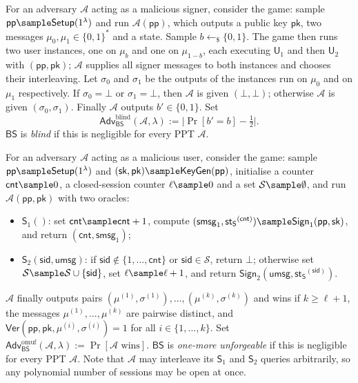 \documentclass{conjura-conjecture}
\newcommand{\BS}{\mathsf{BS}}
\newcommand{\Setup}{\mathsf{Setup}}
\newcommand{\KeyGen}{\mathsf{KeyGen}}
\newcommand{\Sign}{\mathsf{Sign}}
\newcommand{\Uu}{\mathsf{U}}
\newcommand{\Ver}{\mathsf{Ver}}
\newcommand{\pubp}{\mathsf{pp}}
\newcommand{\seck}{\mathsf{sk}}
\newcommand{\pubk}{\mathsf{pk}}
\newcommand{\smsg}{\mathsf{smsg}}
\newcommand{\umsg}{\mathsf{umsg}}
\newcommand{\stS}{\mathsf{st_S}}
\newcommand{\Adv}{\mathsf{Adv}}
\newcommand{\Sorc}{\mathsf{S}}
\newcommand{\cnt}{\mathsf{cnt}}
\newcommand{\sessid}{\mathsf{sid}}
\newcommand{\Ablind}{\Adv^{\mathrm{blind}}}
\newcommand{\Aomuf}{\Adv^{\mathrm{omuf}}}
\newcommand{\rsample}{\leftarrow_{\$}}
\newcommand{\advA}{\mathcal{A}}
\begin{document}
\begin{definition}[Blindness]\label{def:blind}
For an adversary $\advA$ acting as a malicious signer, consider the game:
sample $\pubp \sample \Setup(1^\lambda)$ and run $\advA(\pubp)$, which
outputs a public key $\pubk$, two messages
$\mu_0, \mu_1 \in \{0,1\}^*$ and a state. Sample $b \rsample \{0,1\}$.
The game then runs two user instances, one on $\mu_b$ and one on
$\mu_{1-b}$, each executing $\Uu_1$ and then $\Uu_2$ with
$(\pubp, \pubk)$; $\advA$ supplies all signer messages to both instances
and chooses their interleaving. Let $\sigma_0$ and $\sigma_1$ be the
outputs of the instances run on $\mu_0$ and on $\mu_1$ respectively. If
$\sigma_0 = \bot$ or $\sigma_1 = \bot$, then $\advA$ is given
$(\bot, \bot)$; otherwise $\advA$ is given $(\sigma_0, \sigma_1)$.
Finally $\advA$ outputs $b' \in \{0,1\}$. Set
\[
  \Ablind_{\BS}(\advA, \lambda) := \bigl| \Pr[b' = b] - \tfrac{1}{2}
  \bigr| .
\]
$\BS$ is \emph{blind} if this is negligible for every PPT $\advA$.
\end{definition}

\begin{definition}\label{def:omuf}
For an adversary $\advA$ acting as a malicious user, consider the game:
sample $\pubp \sample \Setup(1^\lambda)$ and
$(\seck, \pubk) \sample \KeyGen(\pubp)$, initialise a counter
$\cnt \sample 0$, a closed-session counter $\ell \sample 0$ and a set
$\mathcal{S} \sample \emptyset$, and run $\advA(\pubp, \pubk)$ with two
oracles:
\begin{itemize}
  \item $\Sorc_1()$: set $\cnt \sample \cnt + 1$, compute
  $(\smsg_{1}, \stS^{(\cnt)}) \sample \Sign_1(\pubp, \seck)$, and return
  $(\cnt, \smsg_{1})$;
  \item $\Sorc_2(\sessid, \umsg)$: if
  $\sessid \notin \{1, \dots, \cnt\}$ or $\sessid \in \mathcal{S}$,
  return $\bot$; otherwise set
  $\mathcal{S} \sample \mathcal{S} \cup \{\sessid\}$, set
  $\ell \sample \ell + 1$, and return
  $\Sign_2(\umsg, \stS^{(\sessid)})$.
\end{itemize}
$\advA$ finally outputs pairs
$(\mu^{(1)}, \sigma^{(1)}), \dots, (\mu^{(k)}, \sigma^{(k)})$ and wins if
$k \geq \ell + 1$, the messages $\mu^{(1)}, \dots, \mu^{(k)}$ are pairwise
distinct, and $\Ver(\pubp, \pubk, \mu^{(i)}, \sigma^{(i)}) = 1$ for all
$i \in \{1, \dots, k\}$. Set
$\Aomuf_{\BS}(\advA, \lambda) := \Pr[\advA \text{ wins}]$. $\BS$ is
\emph{one-more unforgeable} if this is negligible for every PPT $\advA$.
Note that $\advA$ may interleave its $\Sorc_1$ and $\Sorc_2$ queries
arbitrarily, so any polynomial number of sessions may be open at once.
\end{definition}
\end{document}
